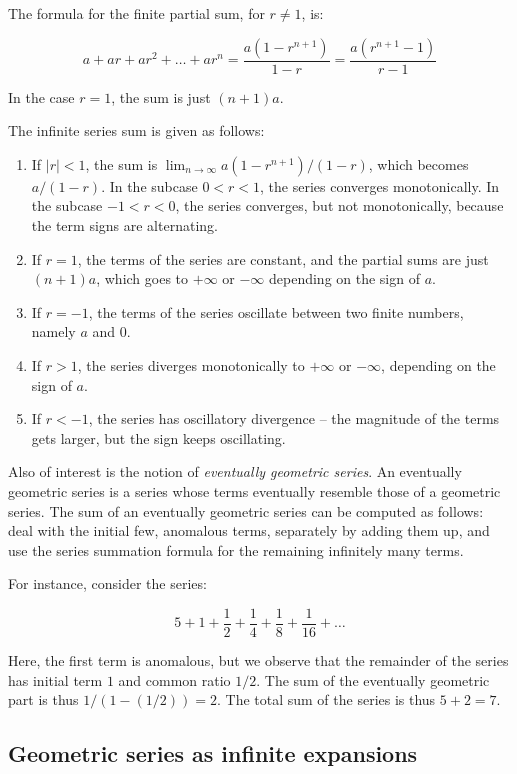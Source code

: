 \documentclass{amsart}
\begin{document}
The formula for the finite partial sum, for $r \ne 1$, is:

$$a + ar + ar^2 + \dots + ar^n = \frac{a(1 - r^{n+1})}{1 - r} = \frac{a(r^{n+1} - 1)}{r - 1}$$

In the case $r = 1$, the sum is just $(n + 1)a$.

The infinite series sum is given as follows:

\begin{enumerate}
\item If $|r| < 1$, the sum is $\lim_{n \to \infty} a(1 - r^{n+1})/(1
  - r)$, which becomes $a/(1 - r)$. In the subcase $0 < r < 1$, the
  series converges monotonically. In the subcase $-1 < r < 0$, the
  series converges, but not monotonically, because the term signs are
  alternating.
\item If $r = 1$, the terms of the series are constant, and the
  partial sums are just $(n + 1)a$, which goes to $+\infty$ or
  $-\infty$ depending on the sign of $a$.
\item If $r = -1$, the terms of the series oscillate between two
  finite numbers, namely $a$ and $0$.
\item If $r > 1$, the series diverges monotonically to $+\infty$ or
  $-\infty$, depending on the sign of $a$.
\item If $r < -1$, the series has oscillatory divergence -- the
  magnitude of the terms gets larger, but the sign keeps oscillating.
\end{enumerate}

Also of interest is the notion of {\em eventually geometric
series}. An eventually geometric series is a series whose terms
eventually resemble those of a geometric series. The sum of an
eventually geometric series can be computed as follows: deal with the
initial few, anomalous terms, separately by adding them up, and use
the series summation formula for the remaining infinitely many terms.

For instance, consider the series:

$$5 + 1 + \frac{1}{2} + \frac{1}{4} + \frac{1}{8} + \frac{1}{16} + \dots$$

Here, the first term is anomalous, but we observe that the remainder
of the series has initial term $1$ and common ratio $1/2$. The sum of
the eventually geometric part is thus $1/(1 - (1/2)) = 2$. The total
sum of the series is thus $5 + 2 = 7$.

\subsection{Geometric series as infinite expansions}
\end{document}
